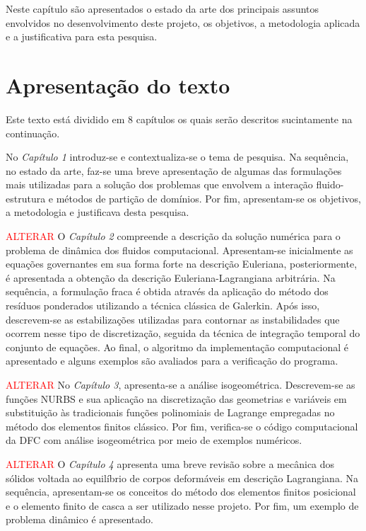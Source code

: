 \documentclass[tese_patricia.tex]{subfiles}
\begin{document}
Neste capítulo são apresentados o estado da arte dos principais assuntos envolvidos no desenvolvimento deste projeto, os objetivos, a metodologia aplicada e a justificativa para esta pesquisa.


\section{Apresentação do texto}

Este texto está dividido em 8 capítulos os quais serão descritos sucintamente na continuação.

No \textit{Capítulo 1} introduz-se e contextualiza-se o tema de pesquisa. Na sequência, no estado da arte, faz-se uma breve apresentação de algumas das formulações mais utilizadas para a solução dos problemas que envolvem a interação fluido-estrutura e métodos de partição de domínios. Por fim, apresentam-se os objetivos, a metodologia e justificava desta pesquisa.

\textcolor{red}{ALTERAR}
O \textit{Capítulo 2} compreende a descrição da solução numérica para o problema de dinâmica dos fluidos computacional. Apresentam-se inicialmente as equações governantes em sua forma forte na descrição Euleriana, posteriormente, é apresentada a obtenção da descrição Euleriana-Lagrangiana arbitrária. Na sequência, a formulação fraca é obtida através da aplicação do método dos resíduos ponderados utilizando a técnica clássica de Galerkin. Após isso, descrevem-se as estabilizações utilizadas para contornar as instabilidades que ocorrem nesse tipo de discretização, seguida da técnica de integração temporal do conjunto de equações. Ao final, o algoritmo da implementação computacional é apresentado e alguns exemplos são avaliados para a verificação do programa.

\textcolor{red}{ALTERAR}
No \textit{Capítulo 3}, apresenta-se a análise isogeométrica. Descrevem-se as funções NURBS e sua aplicação na discretização das geometrias e variáveis em substituição às tradicionais funções polinomiais de Lagrange empregadas no método dos elementos finitos clássico. Por fim, verifica-se o código computacional da DFC com análise isogeométrica por meio de exemplos numéricos.

\textcolor{red}{ALTERAR}
O \textit{Capítulo 4} apresenta uma breve revisão sobre a mecânica dos sólidos voltada ao equilíbrio de corpos deformáveis em descrição Lagrangiana.  Na sequência, apresentam-se os conceitos do método dos elementos finitos posicional e o elemento finito de casca a ser utilizado nesse projeto. Por fim, um exemplo de problema dinâmico é apresentado.
\end{document}
